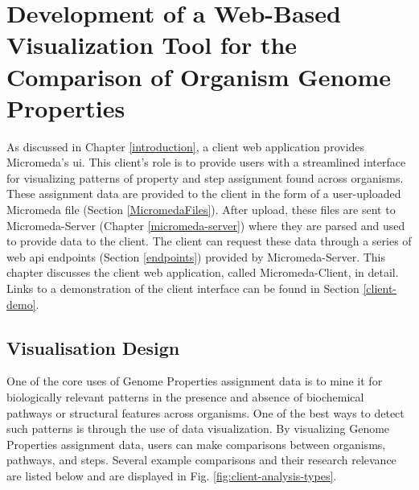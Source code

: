 \chapter{Development of a Web-Based Visualization Tool for the Comparison of 
Organism Genome Properties} \label{micromeda-client}

As discussed in Chapter \ref{introduction}, a client web application provides 
Micromeda's \gls{ui}. This client's role is to provide users with a streamlined 
interface for visualizing patterns of property and step assignment found across 
organisms. These assignment data are provided to the client in the form of a 
user-uploaded Micromeda file (Section \ref{MicromedaFiles}). After upload, these 
files are sent to Micromeda-Server (Chapter \ref{micromeda-server}) where they 
are parsed and used to provide data to the client. The client can request these 
data through a series of web \gls{api} endpoints (Section \ref{endpoints}) 
provided by Micromeda-Server. This chapter discusses the client web application, 
called Micromeda-Client, in detail. Links to a demonstration of the client 
interface can be found in Section \ref{client-demo}.

\section{Visualisation Design} \label{visualization-design}

One of the core uses of Genome Properties assignment data is to mine it for 
biologically relevant patterns in the presence and absence of biochemical 
pathways or structural features across organisms. One of the best ways to detect 
such patterns is through the use of data visualization. By visualizing Genome 
Properties assignment data, users can make comparisons between organisms, 
pathways, and steps. Several example comparisons and their research relevance 
are listed below and are displayed in Fig. \ref{fig:client-analysis-types}. 

